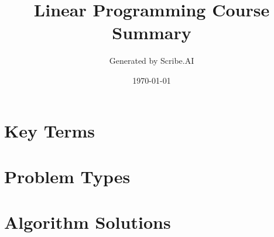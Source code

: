 \documentclass{article}%
\title{Linear Programming Course Summary}%
\author{Generated by Scribe.AI}%
\date{\today}%
\begin{document}
%
\normalsize%
\maketitle%
\section{Key Terms}%
\label{sec:KeyTerms}%
\begin{itemize}[leftmargin=*]%
%
\end{itemize}%
\newpage

%
\section{Problem Types}%
\label{sec:ProblemTypes}%
\begin{itemize}[leftmargin=*]%
%
\end{itemize}%
\newpage

%
\section{Algorithm Solutions}%
\label{sec:AlgorithmSolutions}%
\begin{itemize}[leftmargin=*]%
%
\end{itemize}%
\newpage

%
\end{document}
